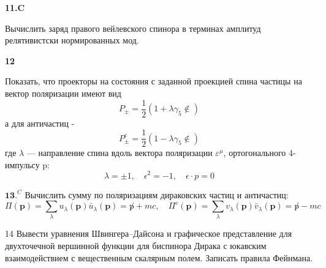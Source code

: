 \documentclass[a4paper,12pt]{article} %
\begin{document}
\begin{ttask}\textbf{11.C}

Вычислить заряд правого вейлевского спинора в терминах амплитуд релятивистски нормированных мод.









\end{ttask}



\begin{ttask} \textbf{12} 

Показать, что проекторы на состояния с заданной проекцией
спина частицы на вектор поляризации имеют вид
$$
P_{\pm}=\frac{1}{2}\left(1+\lambda \gamma_{5} \notin\right)
$$
а для античастиц -
$$
P_{\pm}^{c}=\frac{1}{2}\left(1-\lambda \gamma_{5} \notin\right)
$$
где $\lambda$ — направление спина вдоль вектора поляризации $\varepsilon^\mu$, ортогонального 4-импульсу p:
$$
\lambda=\pm 1, \quad \epsilon^{2}=-1, \quad \epsilon \cdot p=0
$$









\end{ttask}



\begin{ttask}


$\mathbf{1 3 .}^{C}$ Вычислить сумму по поляризациям дираковских частиц и античастиц:
$$
\Pi(\boldsymbol{p})=\sum_{\lambda} u_{\lambda}(\boldsymbol{p}) \bar{u}_{\lambda}(\boldsymbol{p})=\not p+m c, \quad \Pi^{c}(\boldsymbol{p})=\sum_{\lambda} v_{\lambda}(\boldsymbol{p}) \bar{v}_{\lambda}(\boldsymbol{p})=\not p-m c
$$









\end{ttask}






\begin{ttask}

14 Вывести уравнения Швингера–Дайсона и графическое представление для двухточечной вершинной функции для биспинора Дирака с юкавским взаимодействием с вещественным скалярным полем. Записать правила Фейнмана.









\end{ttask}
\end{document}
